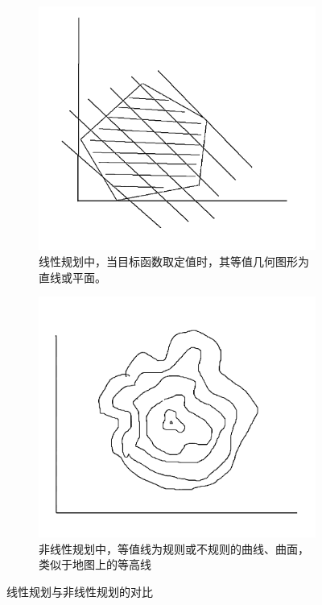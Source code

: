 \begin{figure}[H]
    \centering
    \begin{subfigure}{0.42\textwidth}
        \centering
        \includegraphics[width=\linewidth]{image/17.png}
        \caption{线性规划中，当目标函数取定值时，其等值几何图形为直线或平面。}
    \end{subfigure}
    \hfill
    \begin{subfigure}{0.4\textwidth}
        \centering
        \includegraphics[width=\linewidth]{image/18.png}
        \caption{非线性规划中，等值线为规则或不规则的曲线、曲面，类似于地图上的等高线}
    \end{subfigure}
    \caption{线性规划与非线性规划的对比}
\end{figure}

